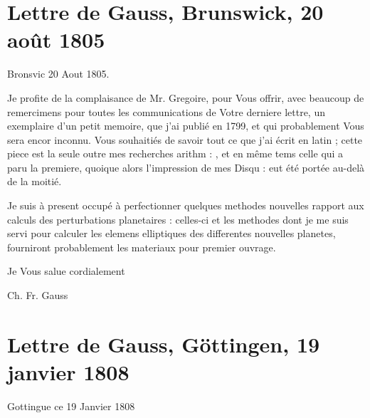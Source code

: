 \documentclass[11pt,a4paper]{article}
\begin{document}

\section{Lettre de Gauss, Brunswick, 20 août 1805}

Bronsvic 20 Aout 1805.

Je profite de la complaisance de Mr. Gregoire, pour Vous offrir, avec beaucoup
de remercimens pour toutes les communications de Votre derniere lettre, un
exemplaire d'un petit memoire, que j'ai publié en 1799, et qui probablement
Vous sera encor inconnu. Vous souhaitiés de savoir tout ce que j'ai écrit en
latin ; cette piece est la seule outre mes recherches arithm : , et en même
tems  celle qui a paru la premiere, quoique alors
l'impression de mes Disqu : eut été portée au-delà de la moitié.

Je suis à present occupé à perfectionner quelques methodes 
nouvelles rapport aux calculs des perturbations planetaires : celles-ci et les
methodes dont je me suis servi pour calculer les elemens elliptiques des
differentes nouvelles planetes, fourniront probablement les materiaux pour
 premier ouvrage.


Je Vous salue cordialement

Ch. Fr. Gauss

\section{Lettre de Gauss, Göttingen, 19 janvier 1808}

Gottingue ce 19 Janvier 1808
\end{document}
